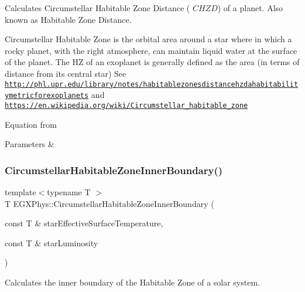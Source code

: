 Calculates Circumstellar Habitable Zone Distance ( $CHZD$) of a planet. Also known as Habitable Zone Distance. 

Circumstellar Habitable Zone is the orbital area around a star where in which a rocky planet, with the right atmosphere, can maintain liquid water at the surface of the planet. The HZ of an exoplanet is generally defined as the area (in terms of distance from its central star) See \href{http://phl.upr.edu/library/notes/habitablezonesdistancehzdahabitabilitymetricforexoplanets}{\tt http\+://phl.\+upr.\+edu/library/notes/habitablezonesdistancehzdahabitabilitymetricforexoplanets} and \href{https://en.wikipedia.org/wiki/Circumstellar_habitable_zone}{\tt https\+://en.\+wikipedia.\+org/wiki/\+Circumstellar\+\_\+habitable\+\_\+zone}

Equation from 
\begin{DoxyParams}{Parameters}
{\em } & \\
\hline
\end{DoxyParams}
\mbox{\label{group___astrophysics_ga9ee2e8023cb444aa4638c962788b5853}} 
\subsubsection{\texorpdfstring{Circumstellar\+Habitable\+Zone\+Inner\+Boundary()}{CircumstellarHabitableZoneInnerBoundary()}}
{\footnotesize\ttfamily template$<$typename T $>$ \\
T E\+G\+X\+Phys\+::\+Circumstellar\+Habitable\+Zone\+Inner\+Boundary (\begin{DoxyParamCaption}\item[{const T \&}]{star\+Effective\+Surface\+Temperature,  }\item[{const T \&}]{star\+Luminosity }\end{DoxyParamCaption})}



Calculates the inner boundary of the Habitable Zone of a solar system. 

